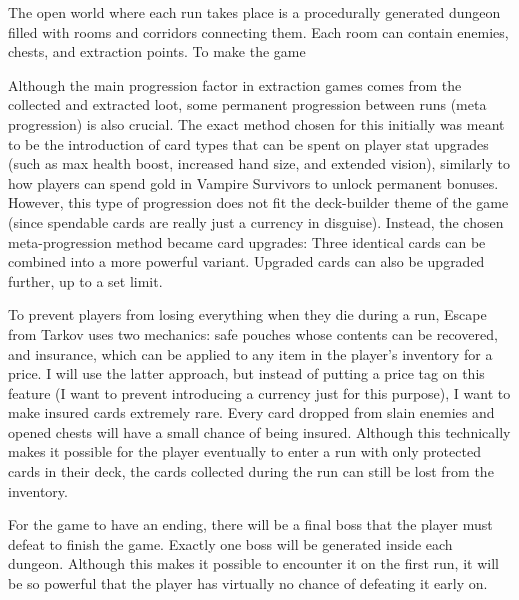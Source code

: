The open world where each run takes place is a procedurally generated dungeon filled with rooms and corridors connecting them. Each room can contain enemies, chests, and extraction points. To make the game 

Although the main progression factor in extraction games comes from the collected and extracted loot, some permanent progression between runs (meta progression) is also crucial. The exact method chosen for this initially was meant to be the introduction of card types that can be spent on player stat upgrades (such as max health boost, increased hand size, and extended vision), similarly to how players can spend gold in Vampire Survivors to unlock permanent bonuses. However, this type of progression does not fit the deck-builder theme of the game (since spendable cards are really just a currency in disguise). Instead, the chosen meta-progression method became card upgrades: Three identical cards can be combined into a more powerful variant. Upgraded cards can also be upgraded further, up to a set limit.

To prevent players from losing everything when they die during a run, Escape from Tarkov uses two mechanics: safe pouches whose contents can be recovered, and insurance, which can be applied to any item in the player's inventory for a price. I will use the latter approach, but instead of putting a price tag on this feature (I want to prevent introducing a currency just for this purpose), I want to make insured cards extremely rare. Every card dropped from slain enemies and opened chests will have a small chance of being insured. Although this technically makes it possible for the player eventually to enter a run with only protected cards in their deck, the cards collected during the run can still be lost from the inventory.

For the game to have an ending, there will be a final boss that the player must defeat to finish the game. Exactly one boss will be generated inside each dungeon. Although this makes it possible to encounter it on the first run, it will be so powerful that the player has virtually no chance of defeating it early on.